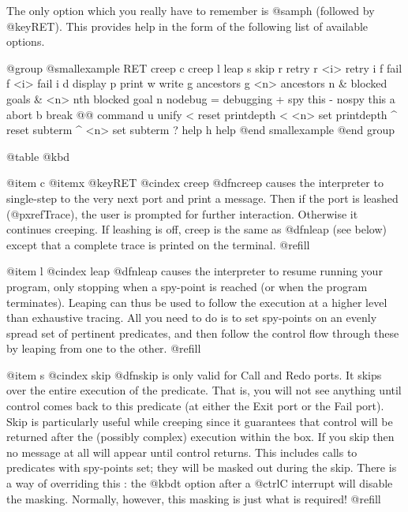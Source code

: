 The only option which you really have to remember is @samp{h} (followed by
@key{RET}).  This provides help in the form of the following list of available
options.

@group
@smallexample
RET    creep            c      creep
 l     leap             s      skip
 r     retry            r <i>  retry i
 f     fail             f <i>  fail i
 d     display          p      print
 w     write
 g     ancestors        g <n>  ancestors n
 &     blocked goals    & <n>  nth blocked goal
 n     nodebug          =      debugging
 +     spy this         -      nospy this
 a     abort            b      break
 @@     command          u      unify
 <     reset printdepth < <n>  set printdepth
 ^     reset subterm    ^ <n>  set subterm
 ?     help             h      help
@end smallexample
@end group

@table @kbd

@item c
@itemx @key{RET}
@cindex creep
@dfn{creep} causes the interpreter to single-step to the very next port
and print a message.  Then if the port is leashed (@pxref{Trace}), the
user is prompted for further interaction.  Otherwise it continues creeping.
If leashing is off, creep is the same as @dfn{leap} (see below) except that a
complete trace is printed on the terminal. @refill

@item l
@cindex leap
@dfn{leap} causes the interpreter to resume running your program, only
stopping when a spy-point is reached (or when the program terminates).
Leaping can thus be used to follow the execution at a higher level than
exhaustive tracing.  All you need to do is to set spy-points on an
evenly spread set of pertinent predicates, and then follow the control
flow through these by leaping from one to the other. @refill

@item s
@cindex skip
@dfn{skip} is only valid for Call and Redo ports.  It skips over the
entire execution of the predicate.  That is, you will not see anything
until control comes back to this predicate (at either the Exit port or
the Fail port).  Skip is particularly useful while creeping since it
guarantees that control will be returned after the (possibly complex)
execution within the box.  If you skip then no message at all will
appear until control returns.  This includes calls to predicates with
spy-points set; they will be masked out during the skip.  There is a way
of overriding this : the @kbd{t} option after a @ctrl{C} interrupt will
disable the masking.  Normally, however, this masking is just what is
required! @refill

